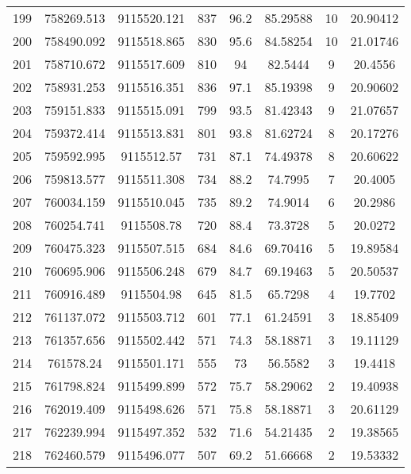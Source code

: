 \begin{longtable}{cccccccc}
199  & 758269.513      & 9115520.121      & 837     & 96.2  & 85.29588 & 10 & 20.90412 \\
200  & 758490.092      & 9115518.865      & 830     & 95.6  & 84.58254 & 10 & 21.01746 \\
201  & 758710.672      & 9115517.609      & 810     & 94    & 82.5444  & 9  & 20.4556  \\
202  & 758931.253      & 9115516.351      & 836     & 97.1  & 85.19398 & 9  & 20.90602 \\
203  & 759151.833      & 9115515.091      & 799     & 93.5  & 81.42343 & 9  & 21.07657 \\
204  & 759372.414      & 9115513.831      & 801     & 93.8  & 81.62724 & 8  & 20.17276 \\
205  & 759592.995      & 9115512.57       & 731     & 87.1  & 74.49378 & 8  & 20.60622 \\
206  & 759813.577      & 9115511.308      & 734     & 88.2  & 74.7995  & 7  & 20.4005  \\
207  & 760034.159      & 9115510.045      & 735     & 89.2  & 74.9014  & 6  & 20.2986  \\
208  & 760254.741      & 9115508.78       & 720     & 88.4  & 73.3728  & 5  & 20.0272  \\
209  & 760475.323      & 9115507.515      & 684     & 84.6  & 69.70416 & 5  & 19.89584 \\
210  & 760695.906      & 9115506.248      & 679     & 84.7  & 69.19463 & 5  & 20.50537 \\
211  & 760916.489      & 9115504.98       & 645     & 81.5  & 65.7298  & 4  & 19.7702  \\
212  & 761137.072      & 9115503.712      & 601     & 77.1  & 61.24591 & 3  & 18.85409 \\
213  & 761357.656      & 9115502.442      & 571     & 74.3  & 58.18871 & 3  & 19.11129 \\
214  & 761578.24       & 9115501.171      & 555     & 73    & 56.5582  & 3  & 19.4418  \\
215  & 761798.824      & 9115499.899      & 572     & 75.7  & 58.29062 & 2  & 19.40938 \\
216  & 762019.409      & 9115498.626      & 571     & 75.8  & 58.18871 & 3  & 20.61129 \\
217  & 762239.994      & 9115497.352      & 532     & 71.6  & 54.21435 & 2  & 19.38565 \\
218  & 762460.579      & 9115496.077      & 507     & 69.2  & 51.66668 & 2  & 19.53332 \\

\end{longtable}
